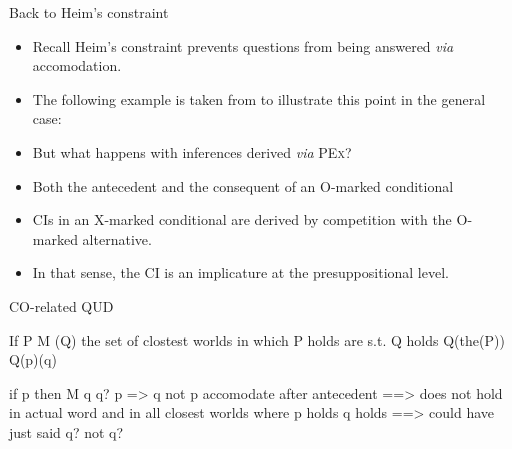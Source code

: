 \documentclass[10pt]{beamer}
\begin{document}
\begin{frame}{Back to Heim's constraint}
	\begin{itemize}
		\item Recall Heim's constraint prevents questions from being answered \textit{via} accomodation.
		\item The following example is taken from \cite{Aravind2022} to illustrate this point in the general case:
	\end{itemize}
	\begin{exe}
		\small
		\begin{xlist}
		\end{xlist}
	\end{exe}
	\begin{itemize}
		\item But what happens with inferences derived \textit{via} \textsc{PEx}?
	\end{itemize}
\end{frame}



\begin{frame}{}
	\begin{itemize}
		\item Both the antecedent and the consequent of an O-marked conditional
		\item CIs in an X-marked conditional are derived by competition with the O-marked alternative.
		\item In that sense, the CI is an implicature at the presuppositional level.
	\end{itemize}
\end{frame}

\begin{frame}{CO-related QUD}
	
\end{frame}


If P M (Q)
the set of clostest worlds in which P holds are s.t. Q holds
Q(the(P))
Q(p)(q)

if p then M q
q?
p => q
not p
accomodate after antecedent
==>  does not hold in actual word and in all closest worlds where p holds q holds
==> could have just said 
q? not q?
\end{document}
